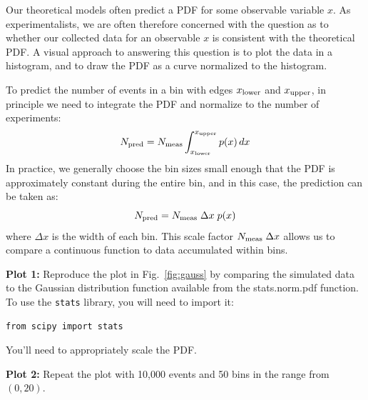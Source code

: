 Our theoretical models often predict a PDF for some observable
variable $x$.  As experimentalists, we are often therefore concerned
with the question as to whether our collected data for an observable
$x$ is consistent with the theoretical PDF.  A visual approach to
answering this question is to plot the data in a histogram, and to
draw the PDF as a curve normalized to the histogram.

To predict the number of events in a bin with edges $x_{\rm lower}$
and $x_{\rm upper}$, in principle we need to integrate the PDF and
normalize to the number of experiments:
\begin{displaymath}
N_{\rm pred} = N_{\rm meas} \int^{x_{\rm upper}}_{x_{\rm lower}} p(x) \, dx
\end{displaymath}
In practice, we generally choose the bin sizes small enough that the
PDF is approximately constant during the entire bin, and in this case,
the prediction can be taken as:
\begin{displaymath}
N_{\rm pred} = N_{\rm meas} \; \Delta x \; p(x)
\end{displaymath}
where $\Delta x$ is the width of each bin.  This scale factor $N_{\rm
  meas} \; \Delta x$ allows us to compare a continuous function to
data accumulated within bins.

{\bf Plot 1:} Reproduce the plot in Fig.~\ref{fig:gauss} by comparing
the simulated data to the Gaussian distribution function available
from the {stats.norm.pdf} function.  To use the {\tt stats} library, you will need to import it:
\begin{verbatim}
from scipy import stats
\end{verbatim}
You'll need to appropriately scale the PDF.


{\bf Plot 2:}  Repeat the plot with 10,000 events and 50 bins in the range from $(0,20)$.















